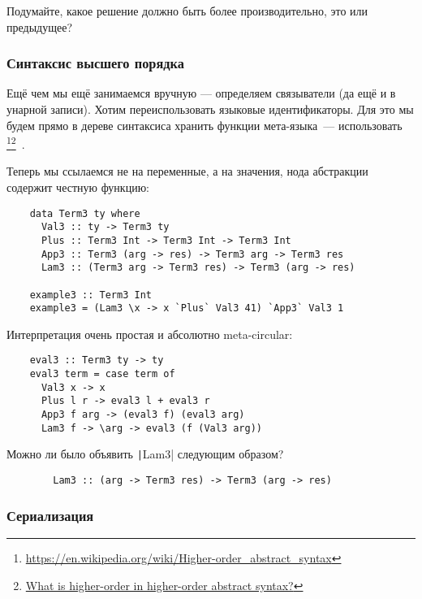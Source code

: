 \begin{task}
    Подумайте, какое решение должно быть более производительно, это или предыдущее?
\end{task}

\subsubsection{Синтаксис высшего порядка} \label{subsubsec:h-syntax}

Ещё чем мы ещё занимаемся вручную --- определяем связыватели (да ещё и в унарной записи).
Хотим переиспользовать языковые идентификаторы.
Для это мы будем прямо в дереве синтаксиса хранить функции мета-языка~--- использовать \footnote{\url{https://en.wikipedia.org/wiki/Higher-order_abstract_syntax}}\footnote{\href{https://cstheory.stackexchange.com/questions/20071/what-is-higher-order-in-higher-order-abstract-syntax}{What is higher-order in higher-order abstract syntax?}}~\cite{pfenning1988higher}.

Теперь мы ссылаемся не на переменные, а на значения, нода абстракции содержит честную функцию:
\begin{verbatim}
    data Term3 ty where
      Val3 :: ty -> Term3 ty
      Plus :: Term3 Int -> Term3 Int -> Term3 Int
      App3 :: Term3 (arg -> res) -> Term3 arg -> Term3 res
      Lam3 :: (Term3 arg -> Term3 res) -> Term3 (arg -> res)

    example3 :: Term3 Int
    example3 = (Lam3 \x -> x `Plus` Val3 41) `App3` Val3 1
\end{verbatim}

Интерпретация очень простая и абсолютно meta-circular:
\begin{verbatim}
    eval3 :: Term3 ty -> ty
    eval3 term = case term of
      Val3 x -> x
      Plus l r -> eval3 l + eval3 r
      App3 f arg -> (eval3 f) (eval3 arg)
      Lam3 f -> \arg -> eval3 (f (Val3 arg))
\end{verbatim}

\begin{task}
    Можно ли было объявить \texttt|Lam3| следующим образом?
    \begin{verbatim}
        Lam3 :: (arg -> Term3 res) -> Term3 (arg -> res)
    \end{verbatim}
\end{task}

\subsubsection{Сериализация}


